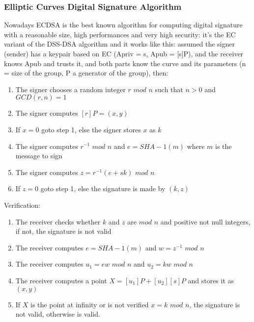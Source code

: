 \subsubsection{Elliptic Curves Digital Signature Algorithm}
Nowadays ECDSA is the best known algorithm for computing digital signature with a reasonable size, high performances and very high security: it's the EC variant of the DSS-DSA algorithm and it works like this: assumed the signer (sender) has a keypair based on EC (Apriv = s, Apub = [s]P), and the receiver knows Apub and trusts it, and both parts know the curve and its parameters (n = size of the group, P a generator of the group), then:
\linebreak
\begin{enumerate}
\item The signer chooses a random integer $r$ $mod$ $n$ such that $n > 0$ and $GCD(r,n) = 1$
\item The signer computes $[r]P = (x,y)$
\item If $x = 0$ goto step 1, else the signer stores $x$ as $k$
\item The signer computes $r^{-1}$ $mod$ $n$ and $e = SHA-1(m)$ where $m$ is the message to sign
\item The signer computes $z = r^{-1}(e + sk)$ $mod$ $n$
\item If $z = 0$ goto step 1, else the signature is made by $(k,z)$
\linebreak
\end{enumerate}
Verification:
\linebreak
\begin{enumerate}
\item The receiver checks whether $k$ and $z$ are $mod$ $n$ and positive not null integers, if not, the signature is not valid
\item The receiver computes $e = SHA-1(m)$ and $w = z^{-1}$ $mod$ $n$
\item The receiver computes $u_{1} = ew$ $mod$ $n$ and $u_{2} = kw$ $mod$ $n$
\item The receiver computes a point $X = [u_{1}]P + [u_{2}][s]P$ and stores it as $(x,y)$
\item If $X$ is the point at infinity or is not verified $x = k$ $mod$ $n$, the signature is not valid, otherwise is valid.
\end{enumerate}